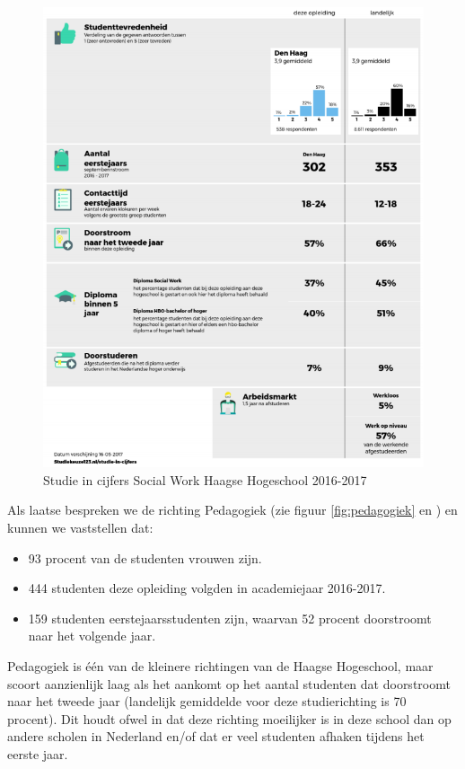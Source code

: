 \begin{figure}
	\includegraphics[width=\textwidth]
	{img/socialwork.png}
	\caption{Studie in cijfers Social Work Haagse Hogeschool 2016-2017}
	\label{fig:socialwork}
\end{figure}

Als laatse bespreken we de richting Pedagogiek (zie figuur \ref{fig:pedagogiek} en \textcite{Studiekeuze2017}) en kunnen we vaststellen dat:
\begin{itemize}
	\item 93 procent van de studenten vrouwen zijn.
	\item 444 studenten deze opleiding volgden in academiejaar 2016-2017.
	\item 159 studenten eerstejaarsstudenten zijn, waarvan 52 procent doorstroomt naar het volgende jaar.
\end{itemize}

Pedagogiek is één van de kleinere richtingen van de Haagse Hogeschool, maar scoort aanzienlijk laag als het aankomt op het aantal studenten dat doorstroomt naar het tweede jaar (landelijk gemiddelde voor deze studierichting is 70 procent). Dit houdt ofwel in dat deze richting moeilijker is in deze school dan op andere scholen in Nederland en/of dat er veel studenten afhaken tijdens het eerste jaar. 

